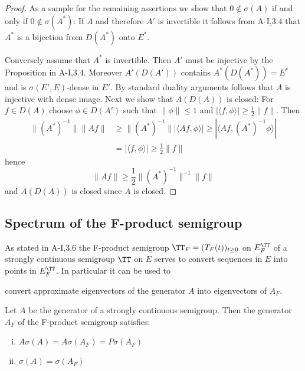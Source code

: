 \begin{proof}
As a sample for the remaining assertions we show that $0 \notin \sigma(A)$ if and only if $0 \notin \sigma(A^*)$:
If $A$ and therefore $A'$ is invertible it follows from A-I,3.4 that $A^*$ is a bijection from $D(A^*)$ onto $E^*$.

Conversely assume that $A^*$ is invertible.
Then $A'$ must be injective by the Proposition in A-I,3.4.
Moreover $A'(D(A'))$ contains $A^*(D(A^*)) = E^*$ and is $\sigma(E',E)$-dense in $E'$.
By standard duality arguments follows that $A$ is injective with dense image.
Next we show that $A(D(A))$ is closed: For $f \in D(A)$ choose $\phi \in D(A')$ such that $\|\phi\| \leq 1$ and $|\langle f,\phi \rangle| \geq \frac{1}{2}\|f\|$.
Then
\begin{align*}
\|(A^*)^{-1}\| \|Af\| &\geq \|(A^*)^{-1}\| |\langle Af,\phi \rangle| \geq |\langle Af,(A^*)^{-1}\phi \rangle| \\
&= |\langle f,\phi \rangle| \geq \frac{1}{2}\|f\|
\end{align*}
hence
\[
\|Af\| \geq \frac{1}{2}\|(A^*)^{-1}\|^{-1}\|f\|
\]
and $A(D(A))$ is closed since $A$ is closed.
\end{proof}

\subsection{Spectrum of the F-product semigroup}\label{subsec:a3-4.5}

As stated in A-I,3.6 the F-product semigroup $\TT_{F} = (T_{F}(t))_{t \geq 0}$ on $E_{F}^{\TT}$ of a strongly continuous semigroup $\TT$ on $E$ serves to convert sequences in $E$ into points in $E_{F}^{\TT}$.
In particular it can be used to



\newpage
convert approximate eigenvectors of the generator $A$ into eigenvectors of $A_{F}$.

\begin{proposition}\label{prop:a3-4.6}
	
	Let $A$ be the generator of a strongly continuous semigroup. Then the generator $A_{F}$ of the F-product semigroup satisfies:
	\begin{enumerate}[(i)]
		\item $A\sigma(A) = A\sigma(A_{F}) = P\sigma(A_{F})$
		
		\item $\sigma(A) = \sigma(A_{F})$
	\end{enumerate}
\end{proposition}

